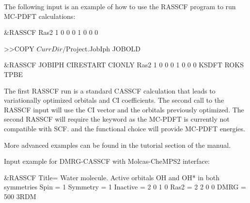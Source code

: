 The following input is an example of how to use the RASSCF program to run MC-PDFT calculations:
\begin{inputlisting}
&RASSCF
Ras2
1 0 0 0 1 0 0 0

>>COPY $CurrDir/$Project.JobIph JOBOLD

&RASSCF
JOBIPH
CIRESTART
CIONLY
Ras2
1 0 0 0 1 0 0 0
KSDFT
ROKS
TPBE
\end{inputlisting}
The first RASSCF run is a standard CASSCF calculation that leads to variationally optimized orbitals and CI coefficients.
The second call to the RASSCF input will use the CI vector and the orbitals previously optimized. The second RASSCF will
require the  keyword as the MC-PDFT is currently not compatible with SCF.   and the functional choice will
provide MC-PDFT energies.

More advanced examples can be found in the tutorial section of the manual.

Input example for DMRG-CASSCF with Molcas-CheMPS2 interface:

\begin{inputlisting}
 &RASSCF
Title= Water molecule. Active orbitals OH and OH* in both symmetries
Spin     = 1
Symmetry = 1
Inactive = 2 0 1 0
Ras2     = 2 2 0 0
DMRG     = 500
3RDM
\end{inputlisting}


